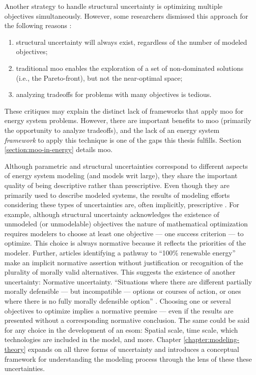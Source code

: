 Another strategy to handle structural uncertainty is optimizing multiple
objectives simultaneously. However, some researchers dismissed this approach for
the following reasons \cite{decarolis_using_2011}:
\begin{enumerate}
    \item structural uncertainty will always exist, regardless of the number of
    modeled objectives;
    \item traditional \ac{moo} enables the exploration of a set of non-dominated
    solutions (i.e., the Pareto-front), but not the near-optimal space;
    \item analyzing tradeoffs for problems with many objectives is tedious.
\end{enumerate}
These critiques may explain the distinct lack of frameworks that apply \ac{moo}
for energy system problems. However, there are important benefits to \ac{moo}
(primarily the opportunity to analyze tradeoffs), and the lack of an energy
system \textit{framework} to apply this technique is one of the gaps this thesis
fulfills. Section \ref{section:moo-in-energy} details \acl{moo}.

Although parametric and structural uncertainties correspond to different aspects
of energy system modeling (and models writ large), they share the important
quality of being descriptive rather than prescriptive. Even though they are
primarily used to describe modeled systems, the results of modeling efforts
considering these types of uncertainties are, often implicitly, prescriptive
\cite{yue_least_2020,decarolis_nc_2018,cochran_la100_2021,bussar_optimal_2014}.
For example, although structural uncertainty acknowledges the existence of
unmodeled (or unmodelable) objectives the nature of mathematical optimization
requires modelers to choose at least one objective --- one success criterion ---
to optimize. This choice is always normative because it reflects the priorities
of the modeler. Further, articles identifying a pathway to ``100\% renewable
energy'' make an implicit normative assertion without justification or
recognition of the plurality of morally valid alternatives. This suggests the
existence of another uncertainty: Normative uncertainty. ``Situations where
there are different partially morally defensible --- but incompatible ---
options or courses of action, or ones where there is no fully morally defensible
option'' \cite{taebi_bridging_2017,van_uffelen_revisiting_2024}. Choosing one or
several objectives to optimize implies a normative premise --- even if the
results are presented without a corresponding normative conclusion. The same
could be said for any choice in the development of an \ac{esom}: Spatial scale,
time scale, which technologies are included in the model, and more. Chapter
\ref{chapter:modeling-theory} expands on all three forms of uncertainty and
introduces a conceptual framework for understanding the modeling process through
the lens of these these uncertainties. 



